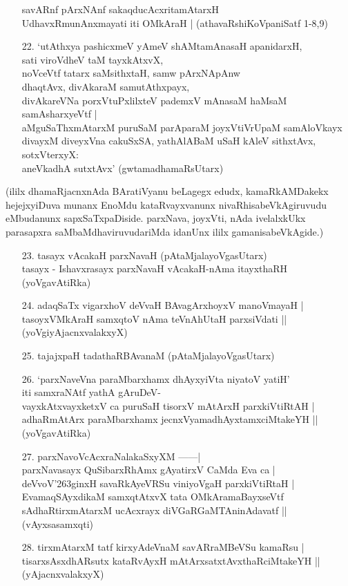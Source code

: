 \begin{itemize}
savARnf pArxNAnf sakaqducAcxritamAtarxH \\
UdhavxRmunAnxmayati iti OMkAraH |
\hfill{(athavaRshiKoVpaniSatf 1-8,9)} 
\item[22.] `utAthxya pashicxmeV yAmeV shAMtamAnasaH apanidarxH,\\\label{146}
sati viroVdheV taM tayxkAtxvX,\\
noVceVtf tatarx saMsithxtaH, samw pArxNApAnw\\
dhaqtAvx, divAkaraM samutAthxpayx,\\
divAkareVNa porxVtuPxlilxteV pademxV mAnasaM haMsaM samAsharxyeVtf |\\
aMguSaThxmAtarxM puruSaM parAparaM joyxVtiVrUpaM samAloVkayx\\
divayxM diveyxVna cakuSxSA, yathAlABaM uSaH kAleV sithxtAvx, sotxVterxyX:\\
aneVkadhA sutxtAvx'
\hfill{(gwtamadhamaRsUtarx)}
\end{itemize}

(ililx dhamaRjacnxnAda BAratiVyanu beLagegx edudx, kamaRkAMDakekx hejejxyiDuva munanx EnoMdu kataRvayxvanunx nivaRhisabeVkAgiruvudu eMbudanunx sapxSaTxpaDiside. parxNava, joyxVti, nAda ivelalxkUkx parasapxra saMbaMdhaviruvudariMda idanUnx ililx gamanisabeVkAgide.)

\begin{itemize}
\item[23.] tasayx vAcakaH parxNavaH (pAtaMjalayoVgasUtarx)\\\label{147}
tasayx - Ishavxrasayx parxNavaH vAcakaH-nAma itayxthaRH 
\hfill{(yoVgavAtiRka)}
\item[24.] adaqSaTx vigarxhoV deVvaH BAvagArxhoyxV manoVmayaH |\\\label{147}
tasoyxVMkAraH samxqtoV nAma teVnAhUtaH parxsiVdati ||\\
\hfill{(yoVgiyAjacnxvalakxyX)}
\item[25.] tajajxpaH tadathaRBAvanaM \hfill{(pAtaMjalayoVgasUtarx)}\label{147}
\item[26.] `parxNaveVna paraMbarxhamx dhAyxyiVta niyatoV yatiH'\\\label{147}
iti samxraNAtf yathA gAruDeV-\\
vayxkAtxvayxketxV ca puruSaH tisorxV mAtArxH parxkiVtiRtAH |\\
adhaRmAtArx paraMbarxhamx jecnxVyamadhAyxtamxciMtakeYH ||
\hfill{(yoVgavAtiRka)}
\item[27.] parxNavoVcAcxraNalakaSxyXM ------|\\\label{147}
parxNavasayx QuSibarxRhAmx gAyatirxV CaMda Eva ca |\\
deVvoV\char'263ginxH savaRkAyeVRSu viniyoVgaH parxkiVtiRtaH |\\
EvamaqSAyxdikaM samxqtAtxvX tata OMkAramaBayxseVtf\\
sAdhaRtirxmAtarxM ucAcxrayx diVGaRGaMTAninAdavatf ||
\hfill{(vAyxsasamxqti)}
\item[28.] tirxmAtarxM tatf kirxyAdeVnaM savARraMBeVSu kamaRsu |\\\label{147}
tisarxsAsxdhARsutx kataRvAyxH mAtArxsatxtAvxthaRciMtakeYH ||
\hfill{(yAjacnxvalakxyX)}\\
\end{itemize}

